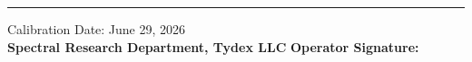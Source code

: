 \documentclass[11pt]{article}
\begin{document}
	\vspace{0.6em}
	\hrule
	\vspace{0.4em}
	\begin{center}
		\small
		Calibration Date: June 29, 2026 \\
		\vspace{0.3em}
		\textbf{Spectral Research Department, Tydex LLC} \hfill \textbf{Operator Signature: \underline{\hspace{4cm}}}
	\end{center}
	
\end{document}
